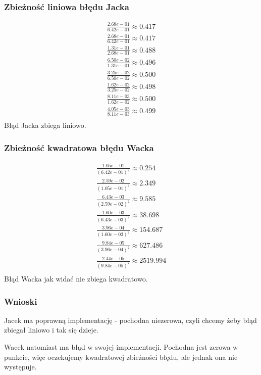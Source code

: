 \documentclass[a4paper]{article}
\begin{document}
   \subsubsection*{Zbieżność liniowa błędu Jacka}

   \begin{gather*}
      \frac{2.68e-01}{6.42e-01} \approx 0.417 \\
      \frac{2.68e-01}{6.42e-01} \approx 0.417 \\
      \frac{1.31e-01}{2.68e-01} \approx 0.488 \\
      \frac{6.50e-02}{1.31e-01} \approx 0.496 \\
      \frac{3.25e-02}{6.50e-02} \approx 0.500 \\
      \frac{1.62e-02}{3.25e-02} \approx 0.498 \\
      \frac{8.11e-03}{1.62e-02} \approx 0.500 \\
      \frac{4.05e-03}{8.11e-03} \approx 0.499 \\
   \end{gather*}
   Błąd Jacka zbiega liniowo.


   \subsubsection*{Zbieżność kwadratowa błędu Wacka}

   \begin{gather*}
      \frac{1.05e-01}{(6.42e-01)^{2}} \approx 0.254 \\
      \frac{2.59e-02}{(1.05e-01)^{2}} \approx 2.349 \\
      \frac{6.43e-03}{(2.59e-02)^{2}} \approx 9.585 \\
      \frac{1.60e-03}{(6.43e-03)^{2}} \approx 38.698 \\
      \frac{3.96e-04}{(1.60e-03)^{2}} \approx 154.687 \\
      \frac{9.84e-05}{(3.96e-04)^{2}} \approx 627.486 \\
      \frac{2.44e-05}{(9.84e-05)^{2}} \approx 2519.994 \\
   \end{gather*}
   Błąd Wacka jak widać nie zbiega kwadratowo.


   \subsubsection*{Wnioski}

   Jacek ma poprawną implementację - pochodna niezerowa,
   czyli chcemy żeby błąd zbiegał liniowo i tak się dzieje.

   Wacek natomiast ma błąd w swojej implementacji.
   Pochodna jest zerowa w punkcie, więc oczekujemy kwadratowej zbieżności błędu,
   ale jednak ona nie występuje.
\end{document}
